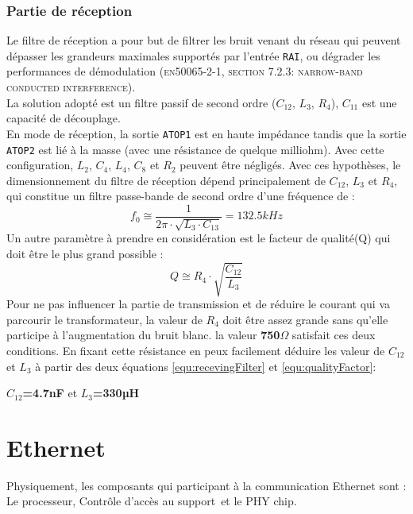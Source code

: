 \documentclass[11pt, a4paper, twoside]{book}
\begin{document}
{\subsubsection{Partie de réception}
Le filtre de réception a pour but de filtrer les bruit venant du réseau qui peuvent dépasser les grandeurs maximales supportés par l'entrée \texttt{RAI}, ou dégrader les performances de démodulation (\textsc{en50065-2-1, section 7.2.3: narrow-band conducted interference}).\\

La solution adopté est un filtre passif de second ordre ($C_{12}$, $L_3$, $R_4$), $C_{11}$ est une capacité de découplage.\\

En mode de réception, la sortie \texttt{ATOP1} est en haute impédance tandis que la sortie \texttt{ATOP2} est lié à la masse (avec une résistance de quelque milliohm). Avec cette configuration, $L_2$, $C_4$, $L_4$, $C_8$ et $R_2$ peuvent être négligés.
Avec ces hypothèses, le dimensionnement du filtre de réception dépend principalement de $C_{12}$, $L_3$ et $R_4$, qui constitue un filtre passe-bande de second ordre d'une fréquence de :
\begin{equation}
\label{equ:recevingFilter}
f_0\cong \dfrac{1}{2\pi \cdot \sqrt{L_3\cdot C_{13}}}=132.5kHz
\end{equation}
Un autre paramètre à prendre en considération est le facteur de qualité(Q) qui doit être le plus grand possible :
\begin{equation}
\label{equ:qualityFactor}
Q\cong R_4\cdot \sqrt{\dfrac{C_{12}}{L_3}}
\end{equation}
Pour ne pas influencer la partie de transmission et de réduire le courant qui va parcourir le transformateur, la valeur de $R_4$ doit être assez grande sans qu'elle participe à l'augmentation du bruit blanc. la valeur \textbf{750$\Omega$} satisfait ces deux conditions. En fixant cette résistance en peux facilement déduire les valeur de $C_{12}$ et $L_3$ à partir des deux équations \ref{equ:recevingFilter} et \ref{equ:qualityFactor}:
\begin{center}
\textbf{$C_{12}$=4.7nF} et \textbf{$L_3$=330µH}
\end{center}
\section{Ethernet}
Physiquement, les composants qui participant à la communication Ethernet sont : Le processeur, Contrôle d'accès au support\footnotemark \ et le PHY chip.
}
\end{document}
